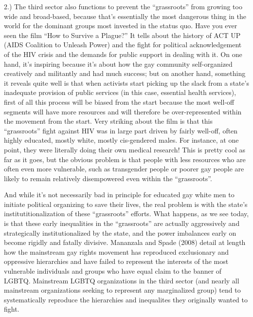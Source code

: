 \documentclass[12pt,book]{article}
\begin{document}
2.) The third sector also functions to prevent the ``grassroots'' from
growing too wide and broad-based, because that's essentially the most
dangerous thing in the world for the dominant groups most invested in
the status quo. Have you ever seen the film ``How to Survive a Plague?''
It tells about the history of ACT UP (AIDS Coalition to Unleash Power)
and the fight for political acknowledgement of the HIV crisis and the
demands for public support in dealing with it. On one hand, it's
inspiring because it's about how the gay community self-organized
creatively and militantly and had much success; but on another hand,
something it reveals quite well is that when activists start picking up
the slack from a state's inadequate provision of public services (in
this case, essential health services), first of all this process will be
biased from the start because the most well-off segments will have more
resources and will therefore be over-represented within the movement
from the start. Very striking about the film is that this ``grassroots''
fight against HIV was in large part driven by fairly well-off, often
highly educated, mostly white, mostly cis-gendered males. For instance,
at one point, they were literally doing their own medical research! This
is pretty cool as far as it goes, but the obvious problem is that people
with less resources who are often even more vulnerable, such as
transgender people or poorer gay people are likely to remain relatively
disempowered even within the ``grassroots''.

And while it's not necessarily bad in principle for educated gay white
men to initiate political organizing to save their lives, the real
problem is with the state's institutitionalization of these
``grassroots'' efforts. What happens, as we see today, is that these
early inequalities in the ``grassroots'' are actually aggressively and
strategically institutionalized by the state, and the power imbalances
early on become rigidly and fatally divisive. Mananzala and Spade (2008)
detail at length how the mainstream gay rights movement has reproduced
exclusionary and oppressive hierarchies and have failed to represent the
interests of the most vulnerable individuals and groups who have equal
claim to the banner of LGBTQ. Mainstream LGBTQ organizations in the
third sector (and nearly all mainstream organizations seeking to
represent any marginalized group) tend to systematically reproduce the
hierarchies and inequalites they originally wanted to fight.
\end{document}
